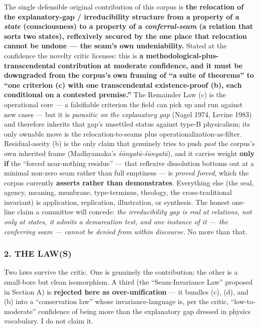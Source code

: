 \documentclass[11pt]{article}
\begin{document}
The single defensible original contribution of this corpus is \textbf{the relocation of the explanatory-gap /\allowbreak{} irreducibility structure from a property of a \emph{state} (consciousness) to a property of a \emph{conferral-seam} (a relation that sorts two states), reflexively secured by the one place that relocation cannot be undone — the seam's own undeniability.} Stated at the confidence the novelty critic licenses: this is \textbf{a methodological-plus-transcendental contribution at moderate confidence, and it must be downgraded from the corpus's own framing of ``a suite of theorems'' to ``one criterion (c) with one transcendental existence-proof (b), each conditional on a contested premise.''} The Remainder Law (c) is the operational core — a falsifiable criterion the field can pick up and run against new cases — but it is \emph{parasitic on the explanatory gap} (Nagel 1974, Levine 1983) and therefore inherits that gap's unsettled status against type-B physicalism; its only ownable move is the relocation-to-seams plus operationalization-as-filter. Residual-aseity (b) is the only claim that genuinely tries to push \emph{past} the corpus's own inherited frame (Madhyamaka's \emph{śūnyatā-śūnyatā}), and it carries weight \textbf{only if} the ``forced near-nothing residue'' — that reflexive dissolution bottoms out at a minimal non-zero seam rather than full emptiness — is \emph{proved forced}, which the corpus currently \textbf{asserts rather than demonstrates}. Everything else (the seal, agency, meaning, membrane, type-terminus, theology, the cross-traditional invariant) is application, replication, illustration, or synthesis. The honest one-line claim a committee will concede: \emph{the irreducibility gap is real at relations, not only at states, it admits a demarcation test, and one instance of it — the conferring seam — cannot be denied from within discourse.} No more than that.

\subsubsection*{2. THE LAW(S)}

Two laws survive the critic. One is genuinely the contribution; the other is a small-bore but clean isomorphism. A third (the ``Seam-Invariance Law'' proposed in Section A) is \textbf{rejected here as over-unification} — it bundles (c), (d), and (b) into a ``conservation law'' whose invariance-language is, per the critic, ``low-to-moderate'' confidence of being more than the explanatory gap dressed in physics vocabulary. I do not claim it.
\end{document}
